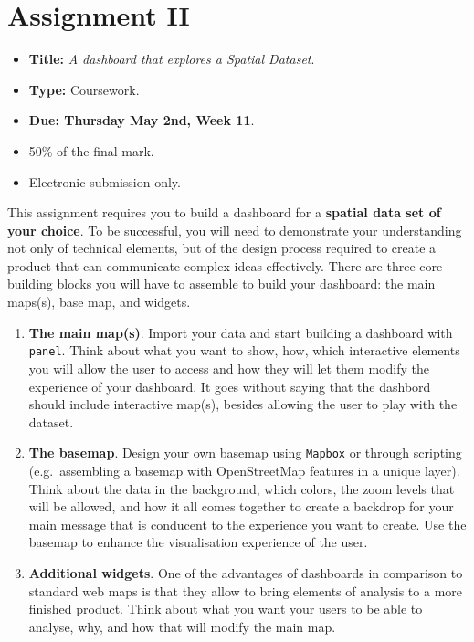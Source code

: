 \documentclass[
  letterpaper,
  DIV=11,
  numbers=noendperiod]{scrreprt}
\providecommand{\tightlist}{%
  \setlength{\itemsep}{0pt}\setlength{\parskip}{0pt}}\usepackage{longtable,booktabs,array}
\begin{document}
\section*{Assignment II}\label{assignment-ii}


\begin{itemize}
\tightlist
\item
  \textbf{Title:} \emph{A dashboard that explores a Spatial Dataset}.
\item
  \textbf{Type:} Coursework.
\item
  \textbf{Due: Thursday May 2nd, Week 11}.
\item
  50\% of the final mark.
\item
  Electronic submission only.
\end{itemize}

This assignment requires you to build a dashboard for a \textbf{spatial
data set of your choice}. To be successful, you will need to demonstrate
your understanding not only of technical elements, but of the design
process required to create a product that can communicate complex ideas
effectively. There are three core building blocks you will have to
assemble to build your dashboard: the main maps(s), base map, and
widgets.

\begin{enumerate}
\def\labelenumi{\arabic{enumi}.}
\tightlist
\item
  \textbf{The main map(s)}. Import your data and start building a
  dashboard with \texttt{panel}. Think about what you want to show, how,
  which interactive elements you will allow the user to access and how
  they will let them modify the experience of your dashboard. It goes
  without saying that the dashbord should include interactive map(s),
  besides allowing the user to play with the dataset.
\item
  \textbf{The basemap}. Design your own basemap using \texttt{Mapbox} or
  through scripting (e.g.~assembling a basemap with OpenStreetMap
  features in a unique layer). Think about the data in the background,
  which colors, the zoom levels that will be allowed, and how it all
  comes together to create a backdrop for your main message that is
  conducent to the experience you want to create. Use the basemap to
  enhance the visualisation experience of the user.
\item
  \textbf{Additional widgets}. One of the advantages of dashboards in
  comparison to standard web maps is that they allow to bring elements
  of analysis to a more finished product. Think about what you want your
  users to be able to analyse, why, and how that will modify the main
  map.
\end{enumerate}
\end{document}
